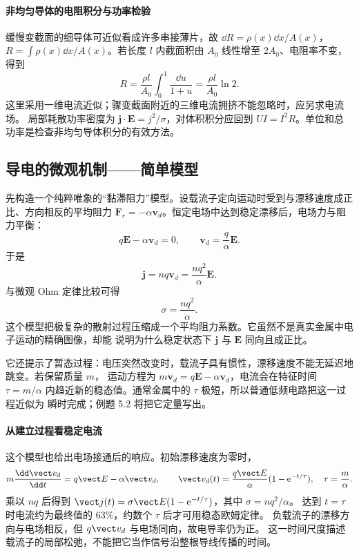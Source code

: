 \paragraph{非均匀导体的电阻积分与功率检验}
缓慢变截面的细导体可近似看成许多串接薄片，故
$\dd R=\rho(x)\dd x/A(x)$，$R=\int\rho(x)\dd x/A(x)$。若长度 $l$ 内截面积由 $A_0$ 线性增至 $2A_0$、电阻率不变，得到
\[
 R=\frac{\rho l}{A_0}\int_0^1\frac{\dd u}{1+u}
 =\frac{\rho l}{A_0}\ln2.
\]
这里采用一维电流近似；骤变截面附近的三维电流拥挤不能忽略时，应另求电流场。
局部耗散功率密度为 $\boldsymbol j\cdot\boldsymbol E=j^2/\sigma$，对体积积分应回到 $UI=I^2R$。单位和总功率是检查非均匀导体积分的有效方法。

\subsection*{导电的微观机制——简单模型}

先构造一个纯粹唯象的“黏滞阻力”模型。设载流子定向运动时受到与漂移速度成正比、方向相反的平均阻力
$\boldsymbol F_r=-\alpha\boldsymbol v_d$。恒定电场中达到稳定漂移后，电场力与阻力平衡：
\[
  q\boldsymbol E-\alpha\boldsymbol v_d=0,
  \qquad \boldsymbol v_d=\frac q\alpha\boldsymbol E.
\]
于是
\[
  \boldsymbol j=nq\boldsymbol v_d=\frac{nq^2}{\alpha}\boldsymbol E.
\]
与微观 Ohm 定律比较可得
\begin{equation}
  \boxed{\sigma=\frac{nq^2}{\alpha}}.
\end{equation}
这个模型把极复杂的散射过程压缩成一个平均阻力系数。它虽然不是真实金属中电子运动的精确图像，却能
说明为什么稳定状态下 $\boldsymbol j$ 与 $\boldsymbol E$ 同向且成正比。

它还提示了暂态过程：电压突然改变时，载流子具有惯性，漂移速度不能无延迟地跳变。若保留质量 $m$，
运动方程为 $m\dot{\boldsymbol v}_d=q\boldsymbol E-\alpha\boldsymbol v_d$，电流会在特征时间
$\tau=m/\alpha$ 内趋近新的稳态值。通常金属中的 $\tau$ 极短，所以普通低频电路把这一过程近似为
瞬时完成；例题 5.2 将把它定量写出。



\paragraph{从建立过程看稳定电流}
这个模型也给出电场接通后的响应。初始漂移速度为零时，
\[
 m\frac{\dd\vect v_d}{\dd t}=q\vect E-\alpha\vect v_d,
 \qquad \vect v_d(t)=\frac{q\vect E}{\alpha}(1-\mathrm e^{-t/\tau}),\quad \tau=\frac m\alpha.
\]
乘以 $nq$ 后得到 $\vect j(t)=\sigma\vect E(1-\mathrm e^{-t/\tau})$，其中 $\sigma=nq^2/\alpha$。
达到 $t=\tau$ 时电流约为最终值的 $63\%$，约数个 $\tau$ 后才可用稳态欧姆定律。
负载流子的漂移方向与电场相反，但 $q\vect v_d$ 与电场同向，故电导率仍为正。
这一时间尺度描述载流子的局部松弛，不能把它当作信号沿整根导线传播的时间。

